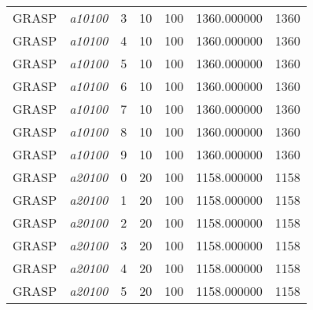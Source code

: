 {\begin{longtable}{cc|c|cc|cc}
			GRASP              & \textit{a10100}    & 3                               & 10               & 100              & 1360.000000                          & 1360 \\ 
			GRASP              & \textit{a10100}    & 4                               & 10               & 100              & 1360.000000                          & 1360 \\ 
			GRASP              & \textit{a10100}    & 5                               & 10               & 100              & 1360.000000                          & 1360 \\ 
			GRASP              & \textit{a10100}    & 6                               & 10               & 100              & 1360.000000                          & 1360 \\ 
			GRASP              & \textit{a10100}    & 7                               & 10               & 100              & 1360.000000                          & 1360 \\ 
			GRASP              & \textit{a10100}    & 8                               & 10               & 100              & 1360.000000                          & 1360 \\ 
			GRASP              & \textit{a10100}    & 9                               & 10               & 100              & 1360.000000                          & 1360 \\ \hline
			GRASP              & \textit{a20100}    & 0                               & 20               & 100              & 1158.000000                          & 1158 \\ 
			GRASP              & \textit{a20100}    & 1                               & 20               & 100              & 1158.000000                          & 1158 \\ 
			GRASP              & \textit{a20100}    & 2                               & 20               & 100              & 1158.000000                          & 1158 \\ 
			GRASP              & \textit{a20100}    & 3                               & 20               & 100              & 1158.000000                          & 1158 \\ 
			GRASP              & \textit{a20100}    & 4                               & 20               & 100              & 1158.000000                          & 1158 \\ 
			GRASP              & \textit{a20100}    & 5                               & 20               & 100              & 1158.000000                          & 1158 \\ 

\end{longtable}}
